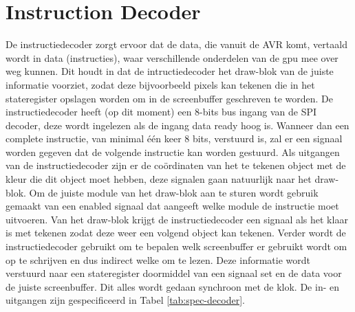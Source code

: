 \documentclass{scrreprt} %
\begin{document}
\section{Instruction Decoder}
De instructiedecoder zorgt ervoor dat de data, die vanuit de AVR komt, vertaald wordt in data (instructies), waar verschillende onderdelen van de gpu mee over weg kunnen. 
Dit houdt in dat de intructiedecoder het draw-blok van de juiste informatie voorziet, zodat deze bijvoorbeeld pixels kan tekenen die in het stateregister opslagen worden om in de screenbuffer geschreven te worden.
De instructiedecoder heeft (op dit moment) een 8-bits bus ingang van de SPI decoder, deze wordt ingelezen als de ingang data ready hoog is.
Wanneer dan een complete instructie, van minimal één keer 8 bits, verstuurd is, zal er een signaal worden gegeven dat de volgende instructie kan worden gestuurd.
Als uitgangen van de instructiedecoder zijn er de coördinaten van het te tekenen object met de kleur die dit object moet hebben, deze signalen gaan natuurlijk naar het draw-blok.
Om de juiste module van het draw-blok aan te sturen wordt gebruik gemaakt van een enabled signaal dat aangeeft welke module de instructie moet uitvoeren.
Van het draw-blok krijgt de instructiedecoder een signaal als het klaar is met tekenen zodat deze weer een volgend object kan tekenen. 
Verder wordt de instructiedecoder gebruikt om te bepalen welk screenbuffer er gebruikt wordt om op te schrijven en dus indirect welke om te lezen. Deze informatie wordt verstuurd naar een stateregister doormiddel van een signaal set en de data voor de juiste screenbuffer. Dit alles wordt gedaan synchroon met de klok.
De in- en uitgangen zijn gespecificeerd in Tabel \ref{tab:spec-decoder}.
\end{document}
